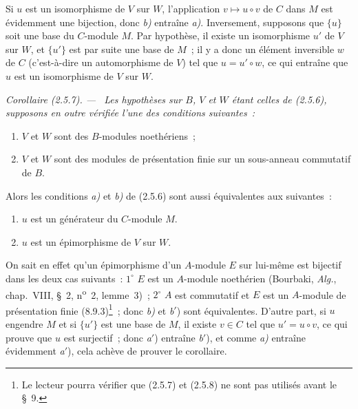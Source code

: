 \documentclass[10pt,oneside]{book}
\newcommand{\oldpage}[2][]{%
  \setcounter{footnote}{0}%
  \marginpar{\scriptsize\textbf{#1}~|~#2}\ignorespaces}
\newenvironment{corollary}[1][]{%
  \par\medskip\noindent\itshape Corollaire (#1). ---\ }{\par}
\begin{document}
Si $u$ est un isomorphisme de $V$ sur $W$, l'application
$v\mapsto u\circ v$ de $C$ dans $M$ est évidemment une bijection, donc
\emph{b)} entraîne \emph{a)}. Inversement, supposons que $\{u\}$ soit une
base du $C$-module $M$. Par hypothèse, il existe un isomorphisme $u'$ de $V$
sur $W$, et $\{u'\}$ est par suite une base de $M$~; il y a donc un élément
inversible $w$ de $C$ (c'est-à-dire un automorphisme de $V$) tel que
$u=u'\circ w$, ce qui entraîne que $u$ est un isomorphisme de $V$ sur $W$.

\begin{corollary}[2.5.7]
\label{IV.2.5.7-fr}
Les hypothèses sur $B$, $V$ et $W$ étant celles de (2.5.6), supposons en
outre vérifiée l'une des conditions suivantes~:
\begin{enumerate}
\item[(i)] $V$ et $W$ sont des $B$-modules noethériens~;
\item[(ii)] $V$ et $W$ sont des modules de présentation finie sur un
sous-anneau commutatif de $B$.
\end{enumerate}
Alors les conditions \emph{a)} et \emph{b)} de (2.5.6) sont aussi
équivalentes aux suivantes~:
\begin{enumerate}
\item[\emph{a}$'$)] $u$ est un générateur du $C$-module $M$.
\item[\emph{b}$'$)] $u$ est un épimorphisme de $V$ sur $W$.
\end{enumerate}
\end{corollary}

On sait en effet qu'un épimorphisme d'un $A$-module $E$ sur lui-même est
bijectif dans les deux cas suivants~: $1^\circ$ $E$ est un $A$-module
noethérien (Bourbaki, \emph{Alg.}, chap.~VIII, \S~2,
n\textsuperscript{o}~2, lemme~3)~; $2^\circ$ $A$ est commutatif et $E$ est
un $A$-module de présentation finie (8.9.3)\footnote{Le lecteur pourra
vérifier que (2.5.7) et (2.5.8) ne sont pas utilisés avant le \S~9.}~; donc
\emph{b)} et \emph{b}$'$) sont équivalentes. D'autre part, si $u$ engendre
$M$
\oldpage[IV-2]{25}
et si $\{u'\}$ est une base de $M$, il existe $v\in C$ tel que
$u'=u\circ v$, ce qui prouve que $u$ est surjectif~; donc \emph{a}$'$)
entraîne \emph{b}$'$), et comme \emph{a)} entraîne évidemment
\emph{a}$'$), cela achève de prouver le corollaire.
\end{document}
